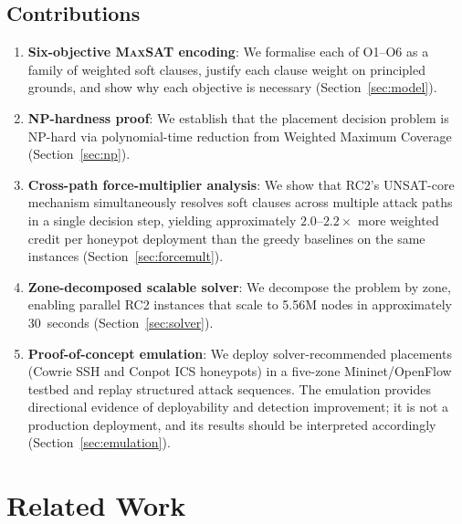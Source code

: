 \documentclass[journal]{IEEEtran}
\newcommand{\MAXSAT}{\textsc{MaxSAT}}
\begin{document}
\subsection{Contributions}
\label{sec:intro:contrib}

\begin{enumerate}
  \item \textbf{Six-objective \MAXSAT{} encoding}: We formalise each
    of O1--O6 as a family of weighted soft clauses, justify each
    clause weight on principled grounds, and show why each objective
    is necessary (Section~\ref{sec:model}).

  \item \textbf{NP-hardness proof}: We establish that the placement
    decision problem is NP-hard via polynomial-time reduction from
    Weighted Maximum Coverage~\cite{feige1998}
    (Section~\ref{sec:np}).

  \item \textbf{Cross-path force-multiplier analysis}: We show that
    RC2's UNSAT-core mechanism simultaneously resolves soft clauses
    across multiple attack paths in a single decision step, yielding
    approximately $2.0$--$2.2\times$ more weighted credit per honeypot
    deployment than the greedy baselines on the same instances
    (Section~\ref{sec:forcemult}).

  \item \textbf{Zone-decomposed scalable solver}: We decompose the
    problem by zone, enabling parallel RC2 instances that scale to
    5.56M nodes in approximately 30~seconds
    (Section~\ref{sec:solver}).

  \item \textbf{Proof-of-concept emulation}: We deploy
    solver-recommended placements (Cowrie SSH and Conpot ICS
    honeypots) in a five-zone Mininet/OpenFlow testbed and replay
    structured attack sequences. The emulation provides directional
    evidence of deployability and detection improvement; it is not
    a production deployment, and its results should be interpreted
    accordingly (Section~\ref{sec:emulation}).
\end{enumerate}

\section{Related Work}
\label{sec:related}
\end{document}

